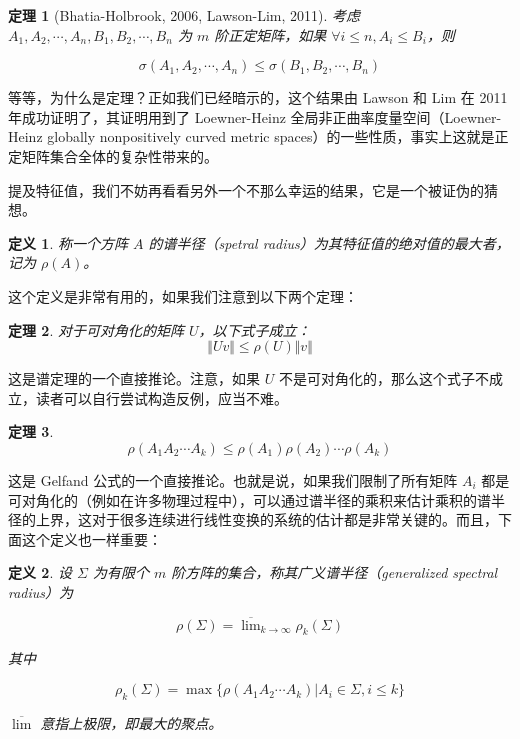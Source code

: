 \documentclass{ctexbook}
\newtheorem{definition}{定义}[chapter] %
\newtheorem{theorem}{定理}[chapter]
\begin{document}
\begin{theorem}[Bhatia-Holbrook, 2006, Lawson-Lim, 2011]
    考虑 $A_1, A_2, \cdots, A_n, B_1, B_2, \cdots, B_n$ 为 $m$ 阶正定矩阵，如果 $\forall i \leqslant n, A_i \leqslant B_i$，则

    \[
    \sigma(A_1, A_2, \cdots, A_n) \leqslant \sigma(B_1, B_2, \cdots, B_n)
    \]
\end{theorem}

等等，为什么是定理？正如我们已经暗示的，这个结果由 Lawson 和 Lim 在 2011 年成功证明了，其证明用到了 Loewner-Heinz 全局非正曲率度量空间（Loewner-Heinz globally nonpositively curved metric spaces）的一些性质，事实上这就是正定矩阵集合全体的复杂性带来的。

提及特征值，我们不妨再看看另外一个不那么幸运的结果，它是一个被证伪的猜想。

\begin{definition}
    称一个方阵 $A$ 的谱半径（spetral radius）为其特征值的绝对值的最大者，记为 $\rho(A)$。
\end{definition}

这个定义是非常有用的，如果我们注意到以下两个定理：

\begin{theorem}
    对于可对角化的矩阵 $U$，以下式子成立：
    \[
    \Vert Uv \Vert \leqslant \rho(U) \Vert v \Vert
    \]
\end{theorem}

这是谱定理的一个直接推论。注意，如果 $U$ 不是可对角化的，那么这个式子不成立，读者可以自行尝试构造反例，应当不难。

\begin{theorem}
    \[
    \rho(A_1A_2\cdots A_k) \leqslant \rho(A_1)\rho(A_2)\cdots \rho(A_k)
    \]
\end{theorem}

这是 Gelfand 公式的一个直接推论。也就是说，如果我们限制了所有矩阵 $A_i$ 都是可对角化的（例如在许多物理过程中），可以通过谱半径的乘积来估计乘积的谱半径的上界，这对于很多连续进行线性变换的系统的估计都是非常关键的。而且，下面这个定义也一样重要：

\begin{definition}
    设 $\Sigma$ 为有限个 $m$ 阶方阵的集合，称其广义谱半径（generalized spectral radius）为

    \[
    \rho(\Sigma) = \overline\lim_{k \to \infty} \rho_k(\Sigma)
    \]

    其中

    \[
    \rho_k(\Sigma) = \max\{\rho(A_1A_2 \cdots A_k) | A_i \in \Sigma, i \leqslant k\}
    \]

    $\overline\lim$ 意指上极限，即最大的聚点。
\end{definition}
\end{document}
